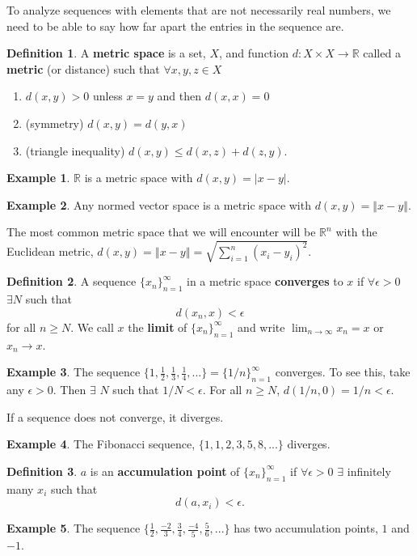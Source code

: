 \documentclass[12pt,reqno]{amsart}
\theoremstyle{definition}
\newtheorem{definition}{Definition}[section]
\newtheorem{example}{Example}[section]
\def\R{\mathbb{R}}
\newcommand{\norm}[1]{\left\Vert {#1} \right\Vert}
\newcommand{\seq}[1]{\{{#1}_n \}_{n=1}^\infty }
\begin{document}
To analyze sequences with elements that are not necessarily real
numbers, we need to be able to say how far apart the entries in the
sequence are. 
\begin{definition}
  A \textbf{metric space} is a set, $X$, and function $d:X\times X
  \rightarrow \R$ called a \textbf{metric} (or distance) such that
  $\forall x, y, z \in X$
  \begin{enumerate}
  \item $d(x,y) > 0$ unless $x=y$ and then $d(x,x) = 0$
  \item (symmetry) $d(x,y) = d(y,x)$
  \item (triangle inequality) $d(x,y) \leq d(x,z) + d(z,y)$.
  \end{enumerate}
\end{definition}
\begin{example}
  $\R$ is a metric space with $d(x,y) = |x - y|$. 
\end{example}
\begin{example}
  Any normed vector space is a metric space with $d(x,y) =
  \norm{x-y}$. 
\end{example}
The most common metric space that we will encounter will be $\R^n$
with the Euclidean metric, $d(x,y) = \norm{x-y} = \sqrt{\sum_{i=1}^n
  (x_i - y_i)^2}$.  
\begin{definition}
  A sequence $\{x_n\}_{n=1}^\infty$ in a metric space \textbf{converges} to $x$
  if $\forall \epsilon > 0$ $\exists N$ such that 
  \[ d(x_n, x) < \epsilon \]
  for all $n \geq N$. We call $x$ the \textbf{limit} of $\seq{x}$ and
  write $\lim_{n \rightarrow \infty} x_n = x$ or $x_n \rightarrow x$. 
\end{definition}
\begin{example}
  The sequence $\{ 1, \frac{1}{2}, \frac{1}{3}, \frac{1}{4}, ... \} =
  \{1/n\}_{n=1}^\infty$ converges. To see this, take any
  $\epsilon>0$. Then $\exists$ $N$ such that $1/N < \epsilon$. For all
  $n \geq N$, $d(1/n,0) = 1/n < \epsilon$. 
\end{example}
If a sequence does not converge, it diverges. 
\begin{example}
  The Fibonacci sequence, $\{ 1, 1, 2, 3, 5, 8, ... \}$ diverges.
\end{example}
\begin{definition}
  $a$ is an \textbf{accumulation point} of $\seq{x}$ if $\forall
  \epsilon > 0$ $\exists$ infinitely many $x_i$ such that 
  \[ d(a, x_i ) < \epsilon. \]
\end{definition}
\begin{example}
  The sequence $\{\frac{1}{2}, \frac{-2}{3}, \frac{3}{4},
  \frac{-4}{5}, \frac{5}{6}, ... \}$ has two accumulation points, $1$ 
  and $-1$.
\end{example}
\end{document}
